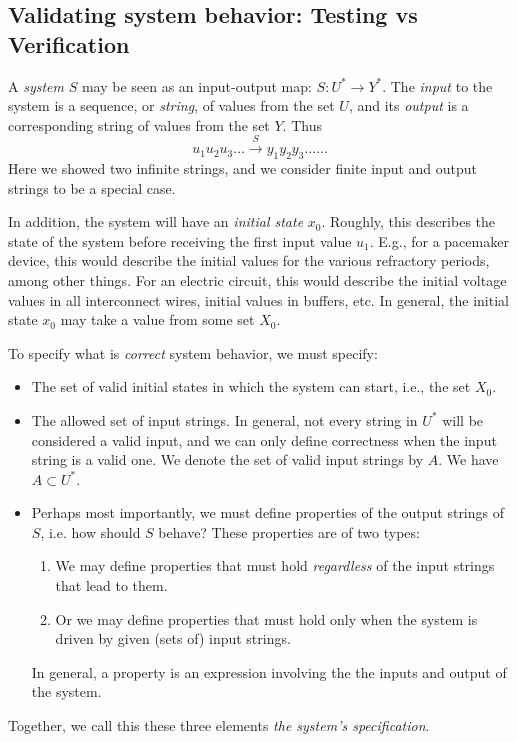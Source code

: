 \subsection{Validating system behavior: Testing vs Verification}
A \emph{system} $S$ may be seen as an input-output map: $S: U^* \rightarrow Y^*$.
The \emph{input} to the system is a sequence, or \emph{string}, of values from the set $U$, and its \emph{output} is a corresponding string of values from the set $Y$.
Thus
\[u_1u_2u_3 \ldots \stackrel{S}{\rightarrow} y_1 y_2 y_3 \ldots...\]
Here we showed two infinite strings, and we consider finite input and output strings to be a special case. 

In addition, the system will have an \emph{initial state} $x_0$. 
Roughly, this describes the state of the system before receiving the first input value $u_1$. 
E.g., for a pacemaker device, this would describe the initial values for the various refractory periods, among other things.
For an electric circuit, this would describe the initial voltage values in all interconnect wires, initial values in buffers, etc.
In general, the initial state $x_0$ may take a value from some set $X_0$.

To specify what is \emph{correct} system behavior, we must specify:
\begin{itemize}
	\item The set of valid initial states in which the system can start, i.e., the set $X_0$.
	\item The allowed set of input strings. In general, not every string in $U^*$ will be considered a valid input, and we can only define correctness when the input string is a valid one.
	We denote the set of valid input strings by $A$. 
	We have $A \subset U^*$.
	\item Perhaps most importantly, we must define properties of the output strings of $S$, i.e. how should $S$ behave?
	These properties are of two types:
	\begin{enumerate}
		\item We may define properties that must hold \emph{regardless} of the input strings that lead to them. 
		\item Or we may define properties that must hold only when the system is driven by given (sets of) input strings.
	\end{enumerate}
	In general, a property is an expression involving the the inputs and output of the system.
\end{itemize}
Together, we call this these three elements \emph{the system's specification}.

